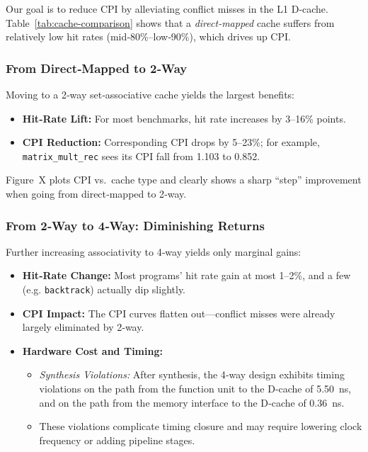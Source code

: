 \label{sec:dcache-opti}

Our goal is to reduce CPI by alleviating conflict misses in the L1 D‑cache.  Table~\ref{tab:cache-comparison} shows that a \emph{direct‑mapped} cache suffers from relatively low hit rates (mid‑80\%–low‑90\%), which drives up CPI.

\subsubsection{From Direct‑Mapped to 2‑Way}
Moving to a 2‑way set‑associative cache yields the largest benefits:
\begin{itemize}
  \item \textbf{Hit‑Rate Lift:} For most benchmarks, hit rate increases by 3–16\% points.
  \item \textbf{CPI Reduction:} Corresponding CPI drops by 5–23\%; for example, \texttt{matrix\_mult\_rec} sees its CPI fall from 1.103 to 0.852.
\end{itemize}
Figure~X plots CPI vs.\ cache type and clearly shows a sharp “step” improvement when going from direct‑mapped to 2‑way.

\subsubsection{From 2‑Way to 4‑Way: Diminishing Returns}
Further increasing associativity to 4‑way yields only marginal gains:
\begin{itemize}
  \item \textbf{Hit‑Rate Change:} Most programs' hit rate gain at most 1–2\%, and a few (e.g. \texttt{backtrack}) actually dip slightly.
  \item \textbf{CPI Impact:} The CPI curves flatten out—conflict misses were already largely eliminated by 2‑way.
  \item \textbf{Hardware Cost and Timing:}
    \begin{itemize}
      \item \emph{Synthesis Violations:} After synthesis, the 4‑way design exhibits timing violations on the path from the function unit to the D‑cache of \SI{5.50}{\nano\second}, and on the path from the memory interface to the D‑cache of \SI{0.36}{\nano\second}.
      \item These violations complicate timing closure and may require lowering clock frequency or adding pipeline stages.
    \end{itemize}
\end{itemize}

